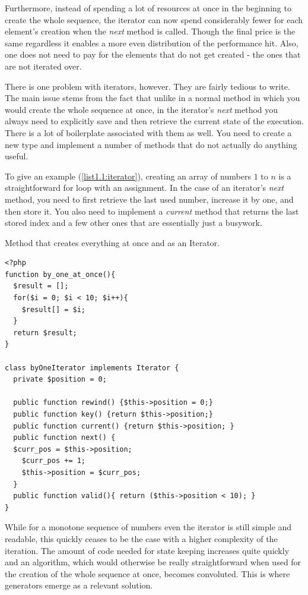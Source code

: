 Furthermore, instead of spending a lot of resources at once in the beginning to create the whole sequence, the iterator can now spend considerably fewer for each element’s creation when the \emph{next} method is called. Though the final price is the same regardless it enables a more even distribution of the performance hit. Also, one does not need to pay for the elements that do not get created - the ones that are not iterated over.

There is one problem with iterators, however. They are fairly tedious to write. The main issue stems from the fact that unlike in a normal method in which you would create the whole sequence at once, in the iterator’s \emph{next} method you always need to explicitly save and then retrieve the current state of the execution. There is a lot of boilerplate associated with them as well. You need to create a new type and implement a number of methods that do not actually do anything useful.

To give an example (\autoref{list1.1:iterator}), creating an array of numbers $1$ to $n$ is a straightforward for loop with an assignment. In the case of an iterator’s \emph{next} method, you need to first retrieve the last used number, increase it by one, and then store it. You also need to implement a \emph{current} method that returns the last stored index and a few other ones that are essentially just a busywork. 

\begin{listing}[H]
	\caption{Method that creates everything at once and as an Iterator.}
	\label{list1.1:iterator}
\begin{verbatim}
<?php
function by_one_at_once(){
  $result = [];
  for($i = 0; $i < 10; $i++){
    $result[] = $i;
  }
  return $result;
}

class byOneIterator implements Iterator {
  private $position = 0;

  public function rewind() {$this->position = 0;}
  public function key() {return $this->position;}
  public function current() {return $this->position; }
  public function next() {
  $curr_pos = $this->position;
    $curr_pos += 1;
    $this->position = $curr_pos;
  }
  public function valid(){ return ($this->position < 10); }
}
\end{verbatim}
\end{listing}

While for a monotone sequence of numbers even the iterator is still simple and readable, this quickly ceases to be the case with a higher complexity of the iteration. The amount of code needed for state keeping increases quite quickly and an algorithm, which would otherwise be really straightforward when used for the creation of the whole sequence at once, becomes convoluted. This is where generators emerge as a relevant solution.


